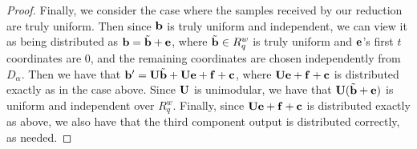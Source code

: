 \begin{proof}
Finally, we consider the case where the samples received by our
reduction are truly uniform. Then since $\mathbf{b}$ is truly uniform and
independent, we can view it as being distributed as
$\mathbf{b}=\tilde{\mathbf{b}}+\mathbf{e}$, where $\tilde{\mathbf{b}} \in R_q^{w}$
is truly uniform and $\mathbf{e}$'s first $t$ coordinates are $0$, and the
remaining coordinates are chosen independently from $D_{\alpha}$. Then
we have that $\mathbf{b}'=\mathbf{U}\tilde{\mathbf{b}}+\mathbf{U}\mathbf{e}+\mathbf{f}+\mathbf{c}$, where
$\mathbf{U}\mathbf{e}+\mathbf{f}+\mathbf{c}$ is distributed exactly as in the case
above. Since $\mathbf{U}$ is unimodular, we have that
$\mathbf{U}(\tilde{\mathbf{b}}+\mathbf{e})$ is uniform and independent over
$R_q^{w}$. Finally, since $\mathbf{U}\mathbf{e}+\mathbf{f}+\mathbf{c}$ is distributed
exactly as above, we also have that the third component output is
distributed correctly, as needed.
\end{proof}
\fi

